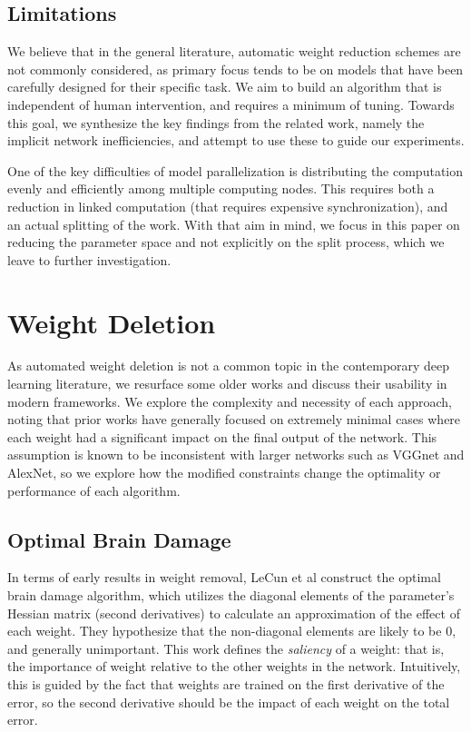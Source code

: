 \documentclass[10pt,twocolumn,letterpaper]{article}
\begin{document}
\subsection{Limitations}
We believe that in the general literature, automatic weight reduction schemes are not commonly considered, as primary focus tends to be on models that have been carefully designed for their specific task.
We aim to build an algorithm that is independent of human intervention, and requires a minimum of tuning.
Towards this goal, we synthesize the key findings from the related work, namely the implicit network inefficiencies, and attempt to use these to guide our experiments.

One of the key difficulties of model parallelization is distributing the computation evenly and efficiently among multiple computing nodes.
This requires both a reduction in linked computation (that requires expensive synchronization), and an actual splitting of the work.
With that aim in mind, we focus in this paper on reducing the parameter space and not explicitly on the split process, which we leave to further investigation.

\section{Weight Deletion}
As automated weight deletion is not a common topic in the contemporary deep learning literature, we resurface some older works and discuss their usability in modern frameworks.
We explore the complexity and necessity of each approach, noting that prior works have generally focused on extremely minimal cases where each weight had a significant impact on the final output of the network.
This assumption is known to be inconsistent with larger networks such as VGGnet and AlexNet, so we explore how the modified constraints change the optimality or performance of each algorithm.
\subsection{Optimal Brain Damage}
In terms of early results in weight removal, LeCun et al \cite{lecun1989optimal} construct the optimal brain damage algorithm, which utilizes the diagonal elements of the parameter's Hessian matrix (second derivatives) to calculate an approximation of the effect of each weight.
They hypothesize that the non-diagonal elements are likely to be 0, and generally unimportant.
This work defines the \emph{saliency} of a weight: that is, the importance of weight relative to the other weights in the network.
Intuitively, this is guided by the fact that weights are trained on the first derivative of the error, so the second derivative should be the impact of each weight on the total error.
\end{document}
